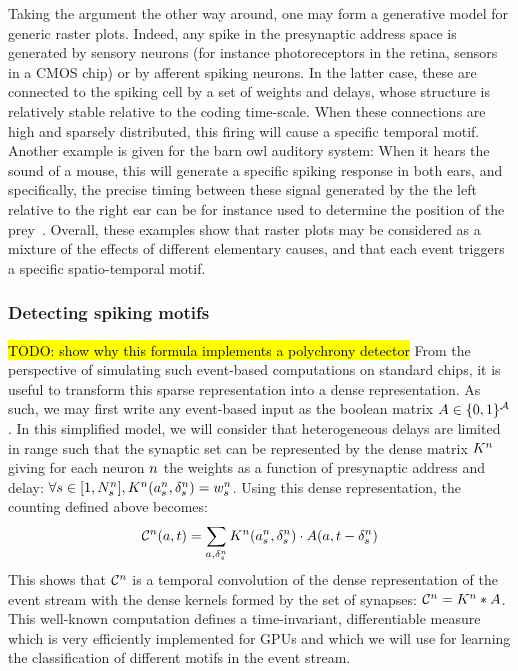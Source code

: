 \documentclass[default]{sn-jnl}%
\theoremstyle{thmstyleone}%
\theoremstyle{thmstyletwo}%
\theoremstyle{thmstylethree}%
\newcommand{\note}[1]{{\sethlcolor{yellow}\hl{#1}}}
\begin{document}
Taking the argument the other way around, one may form a generative model for generic raster plots. Indeed, any spike in the presynaptic address space is generated by sensory neurons (for instance photoreceptors in the retina, sensors in a CMOS chip) or by afferent spiking neurons. In the latter case, these are connected to the spiking cell by a set of weights and delays, whose structure is relatively stable relative to the coding time-scale. When these connections are high and sparsely distributed, this firing will cause a specific temporal motif. Another example is given for the barn owl auditory system: When it hears the sound of a mouse, this will generate a specific spiking response in both ears, and specifically, the precise timing between these signal generated by the the left relative to the right ear can be for instance used to determine the position of the prey~\citep{goodman_spike-timing-based_2010}. Overall, these examples show that raster plots may be considered as a mixture of the effects of different elementary causes, and that each event triggers a specific spatio-temporal motif. 
%
\subsubsection{Detecting spiking motifs}

\note{ TODO: show why this formula implements a polychrony detector }
From the perspective of simulating such event-based computations on standard chips, it is useful to transform this sparse representation into a dense representation. As such, we may first write any event-based input as the boolean matrix $A \in \{0, 1 \}^{\mathcal{A}}$. In this simplified model, we will consider that heterogeneous delays are limited in range such that the synaptic set can be represented by the dense matrix $K^n$ giving for each neuron $n$ the weights as a function of presynaptic address and delay: $\forall {s\in [1,N_{s}^n]}, K^n(a_s^n, \delta_s^n) = w_s^n$. 
Using this dense representation, the counting defined above becomes:
\begin{equation*}
\mathcal{C}^n(a,t)
= \sum_{a, \delta_s^n} K^n(a_s^n, \delta_s^n) \cdot A(a, t-\delta_s^n)
\end{equation*}
%
This shows that $\mathcal{C}^n$ is a temporal convolution of the dense representation of the event stream with the dense kernels formed by the set of synapses:  $\mathcal{C}^n = K^n \ast A$.
This well-known computation defines a time-invariant, differentiable measure which is very efficiently implemented for GPUs and which we will use for learning the classification of different motifs in the event stream.
%
\end{document}
